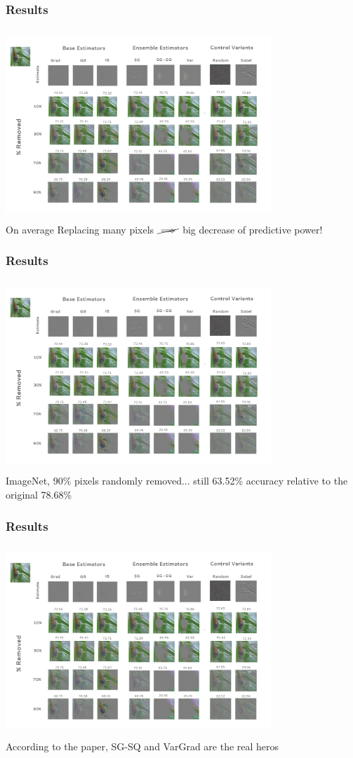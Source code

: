\documentclass{beamer}
\theoremstyle{mystyle}
\begin{document}
\begin{frame}
	\frametitle{Results}
	\includegraphics[height=7.2cm, width=10cm]{ROAR_methods.png}\\
	On average Replacing many pixels $\cancel{\implies}$ big decrease of predictive power! \pause

\end{frame}


\begin{frame}
	\frametitle{Results}
	\includegraphics[height=7.2cm, width=10cm]{ROAR_methods.png}\\
	ImageNet, 90\% pixels randomly removed... still 63.52\% accuracy relative to the original 78.68\% \pause
\end{frame}

\begin{frame}
	\frametitle{Results}
	\includegraphics[height=7.2cm, width=10cm]{ROAR_methods.png}\\

	According to the paper, SG-SQ and VarGrad are the real heros \pause
\end{frame}
\end{document}
